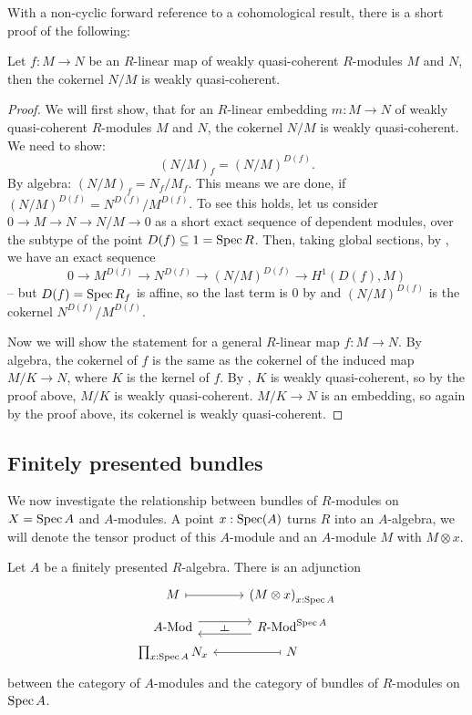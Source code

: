 With a non-cyclic forward reference to a cohomological result,
there is a short proof of the following:

\begin{proposition}%
  Let $f:M\to N$ be an $R$-linear map of weakly quasi-coherent $R$-modules $M$ and $N$,
  then the cokernel $N/M$ is weakly quasi-coherent.
\end{proposition}

\begin{proof}
  We will first show, that for an $R$-linear embedding $m:M\to N$
  of weakly quasi-coherent $R$-modules $M$ and $N$,
  the cokernel $N/M$ is weakly quasi-coherent.
  We need to show:
  \[
    (N/M)_f=(N/M)^{D(f)}.
  \]
  By algebra: $(N/M)_f=N_f/M_f$.
  This means we are done, if $(N/M)^{D(f)}=N^{D(f)}/{M^{D(f)}}$.
  To see this holds, let us consider $0\to M\to N\to N/M\to 0$ as a short exact sequence of dependent modules,
  over the subtype of the point $D(f)\subseteq 1=\operatorname{Spec} R$.
  Then, taking global sections, by ,
  we have an exact sequence
  \[
    0\to M^{D(f)}\to N^{D(f)}\to (N/M)^{D(f)}\to H^1(D(f),M)
  \]
  -- but $D(f)=\operatorname{Spec} R_f$ is affine,
  so the last term is 0 by 
  and $(N/M)^{D(f)}$ is the cokernel $N^{D(f)}/M^{D(f)}$.

  Now we will show the statement for a general $R$-linear map $f:M\to N$.
  By algebra, the cokernel of $f$ is the same as the cokernel of the induced map
  $M/K\to N$, where $K$ is the kernel of $f$.
  By , $K$ is weakly quasi-coherent, so by the proof above,
  $M/K$ is weakly quasi-coherent.
  $M/K\to N$ is an embedding, so again by the proof above, its cokernel is weakly quasi-coherent.
\end{proof}

\subsection{Finitely presented bundles}

We now investigate the relationship between bundles of $R$-modules on $X = \operatorname{Spec} A$
and $A$-modules.
A point $x:\operatorname{Spec}(A)$ turns $R$ into an $A$-algebra, we will denote the tensor product of this $A$-module and an $A$-module $M$
with $M\otimes x$.

\begin{proposition}
  Let $A$ be a finitely presented $R$-algebra.
  There is an adjunction
  \[ \begin{tikzcd}[row sep=tiny]
    M \ar[r, mapsto] & {(M \otimes x)}_{x : \Spec A} \\
    \Mod{A} \ar[r, shift left=2] \ar[r, phantom, "\rotatebox{90}{$\vdash$}"] &
    \Mod{R}^{\Spec A} \ar[l, shift left=2] \\
    \prod_{x : \Spec A} N_x & N \ar[l, mapsto]
  \end{tikzcd} \]
  between the category of $A$-modules
  and the category of bundles of $R$-modules on $\operatorname{Spec} A$.
\end{proposition}

